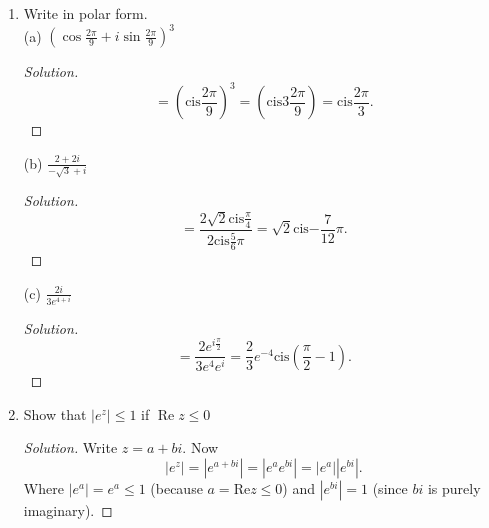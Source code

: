 \begin{enumerate}
(b) $\operatorname{Arg} \bar{z}=-\operatorname{Arg} z$ if $z$ is not a real number.
\begin{proof}[Solution]
	Not always true. True only if $\text{Arg}z \in (-\pi,\pi)$.
\end{proof}

(c) $\operatorname{Arg}\left(z_{1} / z_{2}\right)=\operatorname{Arg} z_{1}-\operatorname{Arg} z_{2}$ if $z_{1} \neq 0, z_{2} \neq 0$.
\begin{proof}[Solution]
	Not always true. True only if $\text{Arg}z_1 - \text{Arg}z_2 \in (-\pi,\pi]$.
\end{proof}

(d) $\arg z=\operatorname{Arg} z+2 \pi k, k=0, \pm 1, \pm 2, \ldots$, if $z \neq 0$.
\begin{proof}[Solution]
	Always true by definition.
\end{proof}


	\item Write in polar form.\\
(a) $\left(\cos \frac{2 \pi}{9}+i \sin \frac{2 \pi}{9}\right)^{3}$
\begin{proof}[Solution]
	\[
		=  \left(\text{cis} { \frac{2\pi}{9}} \right)^3
		=  \left(\text{cis} {3 \frac{2\pi}{9}} \right)
		=  \text{cis} {\frac{2\pi}{3}}.
	\]
\end{proof}
(b) $\frac{2+2 i}{-\sqrt{3}+i}$
\begin{proof}[Solution]
	\[
	= \frac{2\sqrt{2} \text{cis}{ \frac{\pi}{4}}}{2 \text{cis}{ \frac{5}{6}\pi}}
	= \sqrt{2} \text{cis}{- \frac{7}{12}\pi} 
	.\] 	
\end{proof}
(c) $\frac{2 i}{3 e^{4+i}}$
\begin{proof}[Solution]
	\[
	= \frac{2 e^{i\frac{\pi}{2}}}{3 e^{4} e^{i}}
	= \frac{2}{3} e^{-4} \text{cis}{ \left( \frac{\pi}{2} -1 \right) }
	.\] 
\end{proof}

	\item Show that $\left|e^{z}\right| \leq 1$ if $\operatorname{Re} z \leq 0$
\begin{proof}[Solution]
	Write $z = a + bi $. Now \[
	\left| e^z \right| 
	= \left| e^{ a+bi } \right| 
	= \left| e^a e^{bi} \right| 
	= \left| e^a\right| \left|   e^{bi} \right| 
	.\]   
	Where $|e^a| = e^a \le 1$ (because $a = \text{Re} z \le 0$)
	and $\left| e^{bi } \right| = 1$ (since $bi $ is purely imaginary).
\end{proof}
\end{enumerate}
